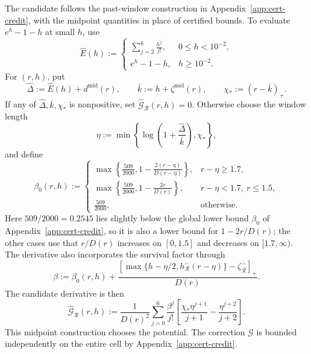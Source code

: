\documentclass[11pt]{article}
\theoremstyle{definition}
\theoremstyle{remark}
\begin{document}
The candidate follows the past-window construction in
Appendix~\ref{app:cert-credit}, with the midpoint quantities in place of certified bounds.  To evaluate $e^h-1-h$ at small $h$, use
\begin{equation}\label{eq:cert-potential-Ehat}
 \widehat E(h):=
 \begin{cases}
 \displaystyle\sum_{j=2}^{6}\frac{h^j}{j!},&0\le h<10^{-2},\\[2mm]
 e^h-1-h,&h\ge10^{-2}.
 \end{cases}
\end{equation}
For $(r,h)$, put
\[
 \widehat\Delta:=\widehat E(h)+d^{\mathrm{mid}}(r),\qquad
 \bar k:=h+\zeta^{\mathrm{mid}}(r),\qquad \chi_*:=(r-\bar k)_+.
\]
If any of $\widehat\Delta,\bar k,\chi_*$ is nonpositive, set
$\widehat{\mathcal G}_{\mathcal R}(r,h)=0$.
Otherwise choose the window length
\begin{equation}\label{eq:cert-potential-length}
 \eta:=\min\left\{\log\left(1+\frac{\widehat\Delta}{\bar k}\right),\chi_*\right\},
\end{equation}
and define
\begin{equation}\label{eq:cert-potential-beta0}
 \beta_0(r,h):=
 \begin{cases}
 \displaystyle\max\left\{\frac{509}{2000},
                1-\frac{2(r-\eta)}{D(r-\eta)}\right\},&r-\eta\ge1.7,\\[3mm]
 \displaystyle\max\left\{\frac{509}{2000},
                1-\frac{2r}{D(r)}\right\},&r-\eta<1.7,\ r\le1.5,\\[3mm]
 \displaystyle\frac{509}{2000},&\text{otherwise}.
 \end{cases}
\end{equation}
Here $509/2000=0.2545$ lies slightly below the global lower bound $\beta_0$ of Appendix~\ref{app:cert-credit}, so it is also a lower bound for $1-2r/D(r)$; the other cases use that $r/D(r)$ increases on $[0,1.5]$ and decreases on $[1.7,\infty)$.
The derivative also incorporates the survival factor through
\begin{equation}\label{eq:cert-potential-beta}
 \beta:=\beta_0(r,h)
 +\frac{\left[\max\{h-\eta/2,h^-_{\mathcal R}(r-\eta)\}
                       -\zeta_{\mathcal R}^-\right]_+}{D(r)}.
\end{equation}
The candidate derivative is then
\begin{equation}\label{eq:cert-potential-Ghat}
 \widehat{\mathcal G}_{\mathcal R}(r,h)
 :=\frac1{D(r)^2}\sum_{j=0}^{6}\frac{\beta^j}{j!}
 \left[\frac{\chi_*\eta^{j+1}}{j+1}-\frac{\eta^{j+2}}{j+2}\right].
\end{equation}
This midpoint construction chooses the potential.  The correction
$\mathcal G$ is bounded independently on the entire cell by
Appendix~\ref{app:cert-credit}.
\end{document}
